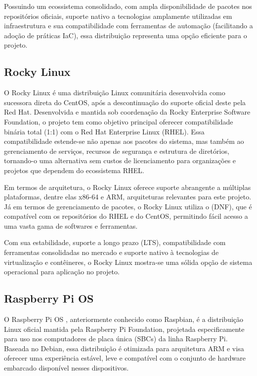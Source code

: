 Possuindo um ecossistema consolidado, com ampla disponibilidade de pacotes nos repositórios oficiais, suporte nativo a tecnologias amplamente utilizadas em infraestrutura e sua compatibilidade com ferramentas de automação (facilitando a adoção de práticas IaC), essa distribuição representa uma opção eficiente para o projeto.

\subsection{Rocky Linux}
\label{subsection:RockyLinux}

O Rocky Linux \citep{rocky2025} é uma distribuição Linux comunitária desenvolvida como sucessora direta do CentOS, após a descontinuação do suporte oficial deste pela Red Hat. Desenvolvida e mantida sob coordenação da Rocky Enterprise Software Foundation, o projeto tem como objetivo principal oferecer compatibilidade binária total (1:1) com o Red Hat Enterprise Linux (RHEL). Essa compatibilidade estende-se não apenas aos pacotes do sistema, mas também ao gerenciamento de serviços, recursos de segurança e estrutura de diretórios, tornando-o uma alternativa sem custos de licenciamento para organizações e projetos que dependem do ecossistema RHEL.

Em termos de arquitetura, o Rocky Linux oferece suporte abrangente a múltiplas plataformas, dentre elas x86-64 e ARM, arquiteturas relevantes para este projeto. Já em termos de gerenciamento de pacotes, o Rocky Linux utiliza o  (DNF), que é compatível com os repositórios do RHEL e do CentOS, permitindo fácil acesso a uma vasta gama de softwares e ferramentas.

Com sua estabilidade, suporte a longo prazo (LTS), compatibilidade com ferramentas consolidadas no mercado e suporte nativo à tecnologias de virtualização e contêineres, o Rocky Linux mostra-se uma sólida opção de sistema operacional para aplicação no projeto.

\subsection{Raspberry Pi OS}
\label{subsection:RaspberryPiOS}

O Raspberry Pi OS \citep{raspisftwr2025}, anteriormente conhecido como Raspbian, é a distribuição Linux oficial mantida pela Raspberry Pi Foundation, projetada especificamente para uso nos computadores de placa única (SBCs) da linha Raspberry Pi. Baseada no Debian, essa distribuição é otimizada para arquitetura ARM e visa oferecer uma experiência estável, leve e compatível com o conjunto de hardware embarcado disponível nesses dispositivos.


